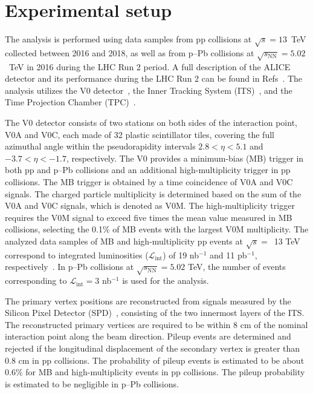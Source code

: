 

\section{Experimental setup}
\label{sec:experiment}

The analysis is performed using data samples from pp collisions at $\sqrt{s} = 13$~TeV collected between 2016 and 2018, as well as from p--Pb collisions at $\sqrt{s_\mathrm{NN}} = 5.02$~TeV in 2016 during the LHC Run 2 period. A full description of the ALICE detector and its performance during the LHC Run 2 can be found in Refs~\cite{Aamodt:2008zz, Abelev:2014ffa}. The analysis utilizes the V0 detector~\cite{Abbas:2013taa}, the Inner Tracking System (ITS)~\cite{aliceITS}, and the Time Projection Chamber (TPC)~\cite{aliceTPC}. 

The V0 detector consists of two stations on both sides of the interaction point, V0A and V0C, each made of 32 plastic scintillator tiles, covering the full azimuthal angle within the pseudorapidity intervals $2.8 < \eta < 5.1$ and $-3.7 < \eta < -1.7$, respectively. The V0 provides a minimum-bias (MB) trigger in both pp and p--Pb collisions and an additional high-multiplicity trigger in pp collisions. The MB trigger is obtained by a time coincidence of V0A and V0C signals. The charged particle multiplicity is determined based on the sum of the V0A and V0C signals, which is denoted as V0M. The high-multiplicity trigger requires the V0M signal to exceed five times the mean value measured in MB collisions, selecting the 0.1\% of MB events with the largest V0M multiplicity. The analyzed data samples of MB and high-multiplicity pp events at $\sqrt{s}=$~13 TeV correspond to integrated luminosities ($\mathcal{L}_\mathrm{int}$) of 19 nb$^{-1}$ and 11 pb$^{-1}$, respectively~\cite{ALICE-PUBLIC-2016-002}. In p--Pb collisions at $\sqrt{s_\mathrm{NN}} = 5.02$ TeV, the number of events corresponding to $\mathcal{L}_\mathrm{int} = 3$ nb$^{-1}$ is used for the analysis. 

The primary vertex positions are reconstructed from signals measured by the Silicon Pixel Detector (SPD)~\cite{Santoro2009:ALICESPD}, consisting of the two innermost layers of the ITS. The reconstructed primary vertices are required to be within 8 cm of the nominal interaction point along the beam direction. Pileup events are determined and rejected if the longitudinal displacement of the secondary vertex is greater than 0.8 cm in pp collisions. The probability of pileup events is estimated to be about 0.6\% for MB and high-multiplicity events in pp collisions. The pileup probability is estimated to be negligible in p--Pb collisions. 

